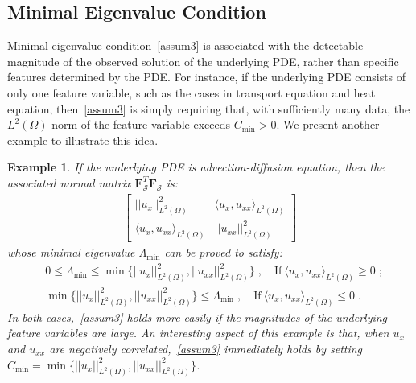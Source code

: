 \documentclass[a4paper,11pt]{article}
\newcommand{\bF}{\mathbf{F}}
\newcommand{\mS}{\mathcal{S}}
\newtheorem{example}{Example}[section]
\begin{document}
\subsection{Minimal Eigenvalue Condition}\label{sec.minimalEigen}
Minimal eigenvalue condition~\eqref{assum3} is associated with the detectable magnitude of the observed solution of the underlying PDE, rather than specific features determined by the PDE. For instance, if the underlying PDE consists of only one feature variable, such as the cases in transport equation and heat equation, then~\eqref{assum3} is simply requiring that, with sufficiently many data, the $L^2(\Omega)$-norm of the  feature variable exceeds $C_{\min}>0$. We present another example to illustrate this idea.
\begin{example} If the underlying PDE is advection-diffusion equation, then the associated normal matrix $\bF_\mS^T\bF_\mS$ is:
\begin{align}
\begin{bmatrix}
||u_x||^2_{L^2(\Omega)}&\langle u_x,u_{xx}\rangle_{L^2(\Omega)}\\
\langle u_x,u_{xx}\rangle_{L^2(\Omega)}&||u_{xx}||^2_{L^2(\Omega)}
\end{bmatrix}
\end{align}
whose minimal eigenvalue $\Lambda_{\min}$ can be proved to satisfy:
\begin{align}
&0\leq \Lambda_{\min}\leq \min\{||u_x||^2_{L^2(\Omega)},||u_{xx}||^2_{L^2(\Omega)}\}\;,\quad\text{If}~\langle u_x,u_{xx}\rangle_{L^2(\Omega)}\geq 0\;;\\
&\min\{||u_x||^2_{L^2(\Omega)},||u_{xx}||^2_{L^2(\Omega)}\}\leq \Lambda_{\min}\;,\quad\text{If}~\langle u_x,u_{xx}\rangle_{L^2(\Omega)}\leq 0\;.
\end{align}
In both cases,~\eqref{assum3} holds more easily if the magnitudes of the underlying feature variables are large. An interesting aspect of this example is that, when $u_x$ and $u_{xx}$ are negatively correlated,~\eqref{assum3} immediately holds by setting $C_{\min} = \min\{||u_x||^2_{L^2(\Omega)},||u_{xx}||^2_{L^2(\Omega)}\}$.
\end{example}
\end{document}
